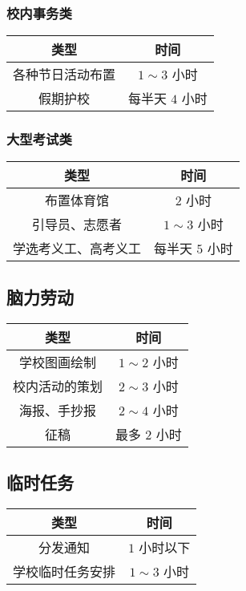 \documentclass{article}
\begin{document}
\subsubsection*{校内事务类}

\begin{tabular}{cc}
  \hline
  \textbf{类型} & \textbf{时间} \\
  \hline
  各种节日活动布置 & $1 \sim 3$ 小时 \\
  假期护校 & 每半天 $4$ 小时 \\
  \hline
\end{tabular}

\subsubsection*{大型考试类}

\begin{tabular}{cc}
  \hline
  \textbf{类型} & \textbf{时间} \\
  \hline
  布置体育馆 & $2$ 小时 \\
  引导员、志愿者 & $1 \sim 3$ 小时 \\
  学选考义工、高考义工 & 每半天 $5$ 小时 \\
  \hline
\end{tabular}

\subsection{脑力劳动}

\begin{tabular}{cc}
  \hline
  \textbf{类型} & \textbf{时间} \\
  \hline
  学校图画绘制 & $1 \sim 2$ 小时 \\
  校内活动的策划 & $2 \sim 3$ 小时 \\
  海报、手抄报 & $2 \sim 4$ 小时 \\
  征稿 & 最多 $2$ 小时 \\
  \hline
\end{tabular}

\subsection{临时任务}

\begin{tabular}{cc}
  \hline
  \textbf{类型} & \textbf{时间} \\
  \hline
  分发通知 & $1$ 小时以下 \\
  学校临时任务安排 & $1 \sim 3$ 小时 \\
  \hline
\end{tabular}
\end{document}
